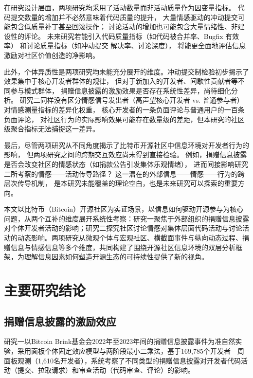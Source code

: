 \documentclass[
    type = master, %
    degree = professional,        %
    decl-page,  %
    twoside,                %
    fontset = fandol %
  ]{njuthesis}
\begin{document}
在研究设计层面，两项研究均采用了活动数量而非活动质量作为因变量指标。
代码提交数量的增加并不必然意味着代码质量的提升，
大量情感驱动的冲动提交可能包含低质量补丁甚至回滚操作；
讨论活动的增加也可能包含大量情绪性、非建设性的评论。
未来研究若能引入代码质量指标（如代码被合并率、Bugfix 有效率）
和讨论质量指标（如冲动提交 解决率、讨论深度），
将能更全面地评估信息激励对社区价值创造的净影响。

此外，个体异质性是两项研究均未能充分展开的维度。冲动提交制检验初步揭示了效果集中于核心开发者群体的规律，
但对于新加入的开发者、间歇性贡献者等不同参与模式群体，
捐赠信息披露的激励效果是否存在系统性差异，尚待细化分析。
研究二同样没有区分情感信号发出者（高声望核心开发者 vs. 普通参与者）
对情感测量指标的差异化权重，
核心开发者的一条负面评论与普通用户的一百条负面评论，
对社区行为的实际影响效果可能存在数量级的差距，但本研究的社区级聚合指标无法捕捉这一差异。

最后，尽管两项研究从不同角度揭示了比特币开源社区中信息环境对开发者行为的影响，
但两项研究之间的跨期交互效应尚未得到直接检验。
例如，捐赠信息披露是否会改变社区的情感状态（如捐款公告引发集体乐观情绪），
进而间接影响研究二所考察的情感——活动传导路径？
这一潜在的外部信息——情感——行为的跨层次传导机制，
是本研究未能覆盖的理论空白，也是未来研究可以探索的重要方向。




本文以比特币（Bitcoin）开源社区为实证场景，以信息如何驱动开源参与为核心问题，从两个互补的维度展开系统性考察：研究一聚焦于外部组织的捐赠信息披露对个体开发者活动的影响；研究二探究社区讨论情感对集体层面代码活动与讨论活动的动态影响。两项研究从微观个体与宏观社区、横截面事件与纵向动态过程、捐赠信息与情感信息等多个维度，共同构建了围绕开源社区信息环境的双层分析框架，为理解信息因素如何塑造开源生态的可持续性提供了新的视角。

\section{主要研究结论}

\subsection{捐赠信息披露的激励效应}

研究一以Bitcoin Brink基金会2022年至2023年间的捐赠信息披露事件为准自然实验，采用面板个体固定效应模型与两阶段最小二乘法，基于169,785个开发者—周面板观测（1,610名开发者），系统考察了不同类型的捐赠信息披露对开发者代码活动（提交、拉取请求）和审查活动（代码审查、评论）的影响。
\end{document}
